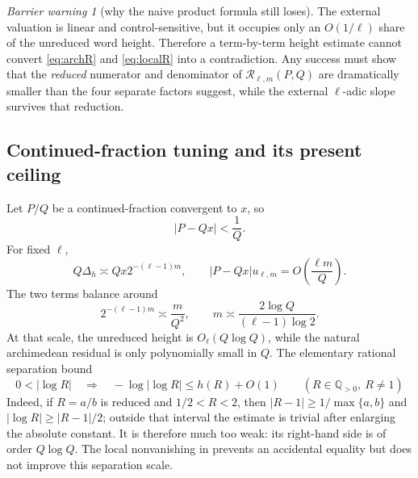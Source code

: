 \documentclass[11pt]{article}
\numberwithin{equation}{section}
\theoremstyle{definition}
\theoremstyle{remark}
\newtheorem{warning}[theorem]{Barrier warning}
\newcommand{\Q}{\mathbb Q}
\begin{document}
\begin{warning}[why the naive product formula still loses]
The external valuation is linear and control-sensitive, but it occupies only an $O(1/\ell)$ share of the unreduced word height.  Therefore a term-by-term height estimate cannot convert \eqref{eq:archR} and \eqref{eq:localR} into a contradiction.  Any success must show that the \emph{reduced} numerator and denominator of $\mathscr R_{\ell,m}(P,Q)$ are dramatically smaller than the four separate factors suggest, while the external $\ell$-adic slope survives that reduction.
\end{warning}

\subsection{Continued-fraction tuning and its present ceiling}

Let $P/Q$ be a continued-fraction convergent to $x$, so
\begin{equation}\label{eq:CF}
  |P-Qx|<\frac1Q.
\end{equation}
For fixed $\ell$,
\begin{equation}\label{eq:archsizes}
  Q\Delta_h\asymp Qx2^{-(\ell-1)m},
  \qquad
  |P-Qx|u_{\ell,m}
  =O\!\left(\frac{\ell m}{Q}\right).
\end{equation}
The two terms balance around
\begin{equation}\label{eq:mtune}
  2^{-(\ell-1)m}\asymp\frac{m}{Q^2},
  \qquad
  m\asymp\frac{2\log Q}{(\ell-1)\log2}.
\end{equation}
At that scale, the unreduced height is $O_\ell(Q\log Q)$, while the natural archimedean residual is only polynomially small in $Q$.  The elementary rational separation bound
\begin{equation}\label{eq:rationalseparation}
  0<|\log R|\quad\Longrightarrow\quad
  -\log|\log R|\le h(R)+O(1)
  \qquad(R\in\Q_{>0},\ R\ne1)
\end{equation}
Indeed, if $R=a/b$ is reduced and $1/2<R<2$, then $|R-1|\ge1/\max\{a,b\}$ and $|\log R|\ge|R-1|/2$; outside that interval the estimate is trivial after enlarging the absolute constant.
It is therefore much too weak: its right-hand side is of order $Q\log Q$.  The local nonvanishing in  prevents an accidental equality but does not improve this separation scale.
\end{document}
